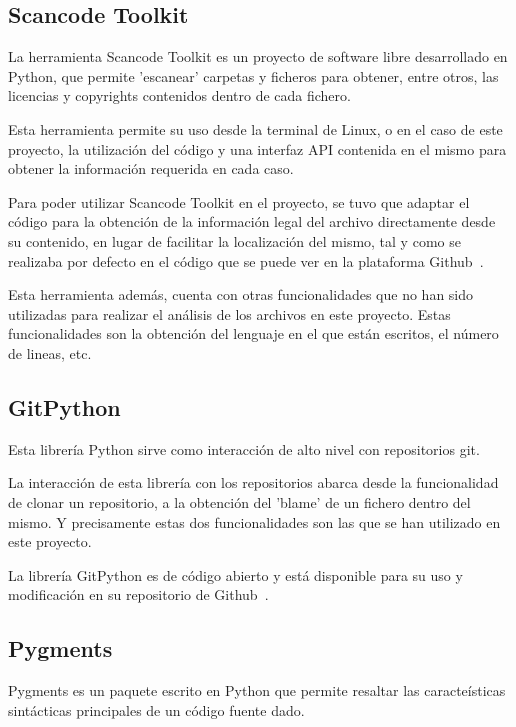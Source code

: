 \documentclass[a4paper, spanish, 12pt]{book}
\begin{document}
\subsection{Scancode Toolkit}
\label{subsec:scancode}

La herramienta Scancode Toolkit es un proyecto de software libre desarrollado en
Python, que permite 'escanear' carpetas y ficheros para obtener, entre otros, las
licencias y copyrights contenidos dentro de cada fichero.

Esta herramienta permite su uso desde la terminal de Linux, o en el caso de este proyecto,
la utilizaci\'on del c\'odigo y una interfaz API contenida en el mismo para obtener la
informaci\'on requerida en cada caso.

Para poder utilizar Scancode Toolkit en el proyecto, se tuvo que adaptar el c\'odigo
para la obtenci\'on de la informaci\'on legal del archivo directamente desde su contenido,
en lugar de facilitar la localizaci\'on del mismo, tal y como se realizaba por defecto
en el c\'odigo que se puede ver en la plataforma Github~\cite{scancode}.

Esta herramienta adem\'as, cuenta con otras funcionalidades que no han sido utilizadas
para realizar el an\'alisis de los archivos en este proyecto. Estas funcionalidades
son la obtenci\'on del lenguaje en el que est\'an escritos, el n\'umero de lineas, etc.

\subsection{GitPython}
\label{subsec:gitpython}

Esta librer\'ia Python sirve como interacci\'on de alto nivel con repositorios git.

La interacci\'on de esta librer\'ia con los repositorios abarca desde la funcionalidad
de clonar un repositorio, a la obtenci\'on del 'blame' de un fichero dentro del mismo.
Y precisamente estas dos funcionalidades son las que se han utilizado en este proyecto.

La librer\'ia GitPython es de c\'odigo abierto y est\'a disponible para su uso y modificaci\'on
en su repositorio de Github~\cite{gitpython}.

\subsection{Pygments}
\label{subsec:pygments}

Pygments es un paquete escrito en Python que permite resaltar las caracte\'isticas
sint\'acticas principales de un c\'odigo fuente dado.
\end{document}
